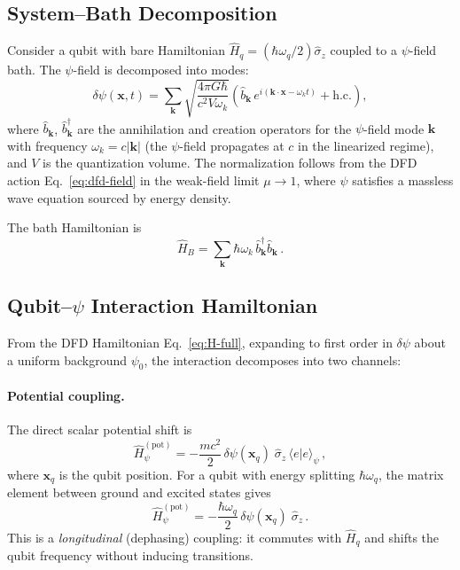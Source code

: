 \documentclass[aps,prl,twocolumn,superscriptaddress,nofootinbib,longbibliography]{revtex4-2}
\begin{document}
\subsection{System--Bath Decomposition}

Consider a qubit with bare Hamiltonian $\hat{H}_q = (\hbar\omega_q/2)
\hat{\sigma}_z$ coupled to a $\psi$-field bath. The $\psi$-field is
decomposed into modes:
\begin{equation}\label{eq:psi-modes}
\delta\psi(\mathbf{x},t) = \sum_\mathbf{k}
\sqrt{\frac{4\pi G\hbar}{c^2 V \omega_k}}
\left(\hat{b}_\mathbf{k}\, e^{i(\mathbf{k}\cdot\mathbf{x} - \omega_k t)}
+ \text{h.c.}\right),
\end{equation}
where $\hat{b}_\mathbf{k}$, $\hat{b}_\mathbf{k}^\dagger$ are the
annihilation and creation operators for the $\psi$-field mode $\mathbf{k}$
with frequency $\omega_k = c|\mathbf{k}|$ (the $\psi$-field propagates
at $c$ in the linearized regime), and $V$ is the quantization volume.
The normalization follows from the DFD action Eq.~\eqref{eq:dfd-field}
in the weak-field limit $\mu \to 1$, where $\psi$ satisfies a massless
wave equation sourced by energy density.

The bath Hamiltonian is
\begin{equation}
\hat{H}_B = \sum_\mathbf{k} \hbar\omega_k\,
\hat{b}_\mathbf{k}^\dagger \hat{b}_\mathbf{k}\,.
\end{equation}

\subsection{Qubit--$\psi$ Interaction Hamiltonian}

From the DFD Hamiltonian Eq.~\eqref{eq:H-full}, expanding to first
order in $\delta\psi$ about a uniform background $\psi_0$, the
interaction decomposes into two channels:

\paragraph{Potential coupling.}
The direct scalar potential shift is
\begin{equation}
\hat{H}_\psi^{(\text{pot})} = -\frac{mc^2}{2}\,\delta\psi(\mathbf{x}_q)
\;\hat{\sigma}_z\,\langle e|e\rangle_\psi\,,
\end{equation}
where $\mathbf{x}_q$ is the qubit position. For a qubit with energy
splitting $\hbar\omega_q$, the matrix element between ground and excited
states gives
\begin{equation}\label{eq:pot-coupling}
\hat{H}_\psi^{(\text{pot})} = -\frac{\hbar\omega_q}{2}\,
\delta\psi(\mathbf{x}_q)\;\hat{\sigma}_z\,.
\end{equation}
This is a \emph{longitudinal} (dephasing) coupling: it commutes with
$\hat{H}_q$ and shifts the qubit frequency without inducing transitions.
\end{document}
